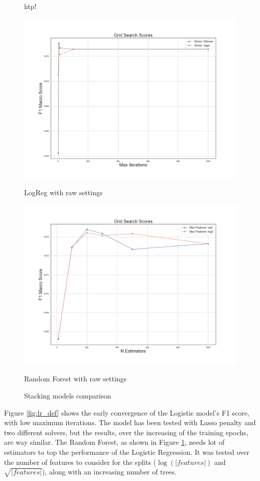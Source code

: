 \begin{figure}{htp!}
	\begin{multicols}{2}
		\includegraphics[width=\linewidth]{chapter5/figure/logreg_default.png}\par 
		\caption{LogReg with raw settings}
		\label{fig:lr_def}
		\includegraphics[width=\linewidth]{chapter5/figure/random_forest_default.png}\par 
		\caption{Random Forest with raw settings}
		\label{fig:rf_def}
	\end{multicols}
	\caption{Stacking models comparison}
\end{figure}

Figure \ref{fig:lr_def} shows the early convergence of the Logistic model's F1 score, with low maximum iterations. The model has been tested with Lasso penalty and two different solvers, but the results, over the increasing of the training epochs, are way similar.
The Random Forest, as shown in Figure \ref{fig:rf_def}, needs lot of estimators to top the performance of the Logistic Regression. It was tested over the number of features to consider for the splits ($ \log(|features|) $ and $ \sqrt{|features|} $), along with an increasing number of trees.

